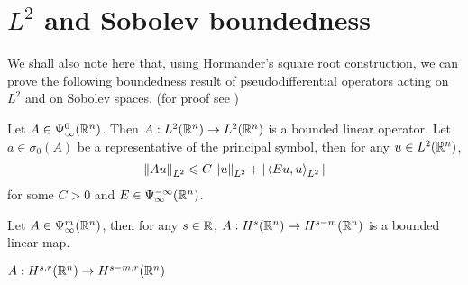 \documentclass[12pt]{article}
\begin{document}
\section{$L^2$ and Sobolev boundedness} 
We shall also note here that, using Hormander's square root construction, we can prove the following boundedness result of pseudodifferential operators acting on $L^2$ and on Sobolev spaces. (for proof see )

\begin{fprop}
    Let $A \in \Psi^{0}_{\infty}(\R^n)$. Then $A : L^2(\R^n) \to L^2(\R^n)$ is a bounded linear operator. Let $a \in \sigma_0(A)$ be a representative of the principal symbol, then for any $u \in L^2(\R^n)$, 
    \begin{align*}
    \norm[A u ]_{L^2} \leq C \norm[u]_{L^2} + \abs{\inprod[Eu, u]_{L^2}}
    \end{align*}
    for some $C > 0$ and $E \in \Psi^{-\infty}_{\infty}(\R^n)$. 
\end{fprop}

\begin{fprop}
    Let $A \in \Psi^{m}_{\infty}(\R^n)$, then for any $s \in \R$, $A : H^{s}(\R^n) \to H^{s - m}(\R^n)$ is a bounded linear map. 
\end{fprop}

\begin{flemma}
    
\end{flemma}

\begin{fprop}
    $A: H^{s, r}(\R^n) \to H^{s - m, r}(\R^n)$
\end{fprop}
\end{document}
